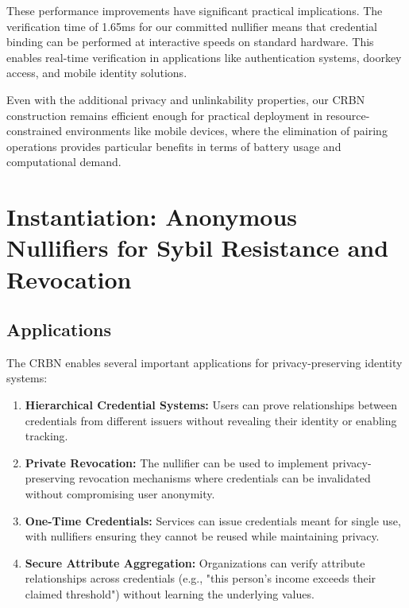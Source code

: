 These performance improvements have significant practical implications. The verification time of 1.65ms for our committed nullifier means that credential binding can be performed at interactive speeds on standard hardware. This enables real-time verification in applications like authentication systems, doorkey access, and mobile identity solutions.

Even with the additional privacy and unlinkability properties, our CRBN construction remains efficient enough for practical deployment in resource-constrained environments like mobile devices, where the elimination of pairing operations provides particular benefits in terms of battery usage and computational demand.




\section{Instantiation: Anonymous Nullifiers for Sybil Resistance and Revocation}

\subsection{Applications}

The CRBN enables several important applications for privacy-preserving identity systems:

\begin{enumerate}
    \item \textbf{Hierarchical Credential Systems:} Users can prove relationships between credentials from different issuers without revealing their identity or enabling tracking.
    
    \item \textbf{Private Revocation:} The nullifier can be used to implement privacy-preserving revocation mechanisms where credentials can be invalidated without compromising user anonymity.
    
    \item \textbf{One-Time Credentials:} Services can issue credentials meant for single use, with nullifiers ensuring they cannot be reused while maintaining privacy.
    
    \item \textbf{Secure Attribute Aggregation:} Organizations can verify attribute relationships across credentials (e.g., "this person's income exceeds their claimed threshold") without learning the underlying values.
\end{enumerate}

